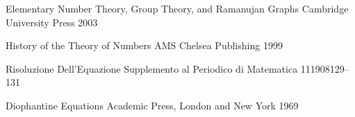 \documentclass[12pt]{article}
\theoremstyle{definition}
\numberwithin{equation}{section}
\begin{document}
\begin{thebibliography}{1}




         {Elementary Number Theory,
           Group Theory,
           and Ramanujan Graphs}
         {Cambridge University Press}
         {2003}

         {History of the Theory of Numbers}
         {AMS Chelsea Publishing}
         {1999}




        {Risoluzione Dell'Equazione}
        {Supplemento al Periodico di Matematica}
        {11}{1908}{129--131}



         {Diophantine Equations}
         {Academic Press, London and New York} 
         {1969}


\end{thebibliography}
\end{document}
